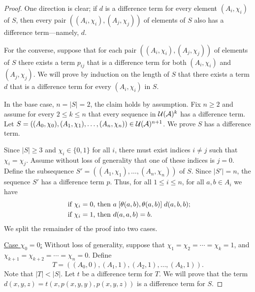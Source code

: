 \begin{proof}
  One direction is clear; if $d$ is a \glocal difference term for every
  element $(A_i, \chi_i)$ of $S$, then  every pair $((A_i,\chi_i),
  (A_j,\chi_j))$ of elements of $S$ also has a \glocal difference
  term---namely, $d$.

  For the converse, suppose that
  for each pair $((A_i,\chi_i), (A_j,\chi_j))$ of elements of $S$ there exists a
  term $p_{ij}$ that is a \glocal difference term for both
  $(A_i,\chi_i)$ and $(A_j,\chi_j)$.
  We will prove by induction on the length of $S$ that
  there exists a term $d$ that is a \glocal difference term for every
  $(A_i, \chi_i)$ in $S$.

  In the base case, $n = |S| = 2$, the claim holds by assumption.
  Fix $n\geq 2$ and assume for every
  $2\leq k \leq n$ that every sequence in $\mathcal{U}(\mathcal{A})^k$
  has a \glocal difference term. Let
  $S = ((A_0, \chi_0), (A_1, \chi_1), \dots, (A_{n},\chi_{n})) \in \mathcal{U}(\mathcal{A})^{n+1}$.
  We prove  $S$ has a \glocal difference term.

  Since $|S| \geq 3$ and $\chi_i \in \{0,1\}$ for all $i$, there must exist
  indices $i\neq j$ such that $\chi_i = \chi_j$. Assume without loss of generality
  that one of these indices is $j=0$.  Define the subsequence
  $S' = ((A_1, \chi_1), \dots,(A_{n},\chi_{n}))$ of $S$. %
  Since $|S'| = n$, the sequence $S'$ has a \glocal difference term $p$.
  Thus, for all $1\leq i \leq n$,
  for all $a, b\in A_i$  we have
  \begin{align*}
    \text{ if $\chi_i=0$, then } &
    a \mathrel{[\theta(a,b), \theta(a,b)]} d(a,b,b);\\
    \text{ if $\chi_i=1$, then } &
    d(a,a,b) = b.
  \end{align*}
  We split the remainder of the proof into two cases.

\vskip3mm

\noindent \underline{Case $\chi_0 = 0$:}
Without loss of generality, suppose that
$\chi_1 = \chi_2 = \cdots =\chi_k = 1$,
and
$\chi_{k+1} = \chi_{k+2} = \cdots = \chi_{n} = 0$.
Define
\[
T = ((A_0, 0), (A_1, 1), (A_2, 1), \dots, (A_k, 1)).
\]
Note that $|T| < |S|$.
Let $t$ be a \glocal difference term for $T$.
We will prove that the term $d(x,y,z) = t(x, p(x,y,y), p(x,y,z))$
is a \glocal difference term for $S$.


\end{proof}
